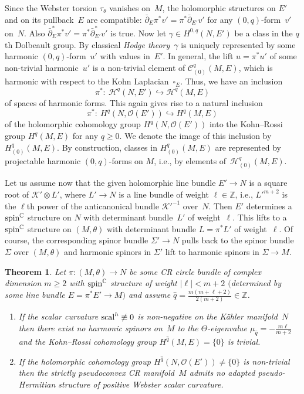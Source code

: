 \documentclass[pdftex]{sigma}
\numberwithin{equation}{section}
\newtheorem{Theorem}{Theorem}[section]
\newcommand{\ZZ}{\mathbb{Z}}
\newcommand{\CC}{\mathbb{C}}
\begin{document}
Since the Webster torsion $\tau_\theta$ vanishes on~$M$, the holomorphic structures on $E'$ and on its pullback~$E$ are compatible:
$\bar{\partial}_E\pi^*v'=\pi^*\bar{\partial}_{E'}v'$ for any $(0,q)$-form~$v'$ on~$N$.
Also $\bar{\partial}^*_E\pi^*v'=\pi^*\bar{\partial}^*_{E'}v'$ is true.
Now let $\gamma\in H^{0,q}(N,E')$ be a class in the $q$th Dolbeault group. By classical {\em Hodge theory}~$\gamma$ is
uniquely represented by some harmonic $(0,q)$-form~$u'$ with values in~$E'$. In general,
the lift $u=\pi^*u'$ of some non-trivial harmonic~$u'$ is a non-trivial element of $\mathcal{C}_{(0)}^q(M,E)$, which is
harmonic with respect to the Kohn Laplacian~$\square_E$. Thus, we have an inclusion
\[
\pi^*\colon \ \mathcal{H}^q(N,E') \hookrightarrow \mathcal{H}^q(M,E)
\]
of spaces of harmonic forms. This again gives rise to a natural inclusion
\[
\pi^*\colon \ H^q(N,\mathcal{O}(E')) \hookrightarrow H^q(M,E)
\]
of the holomorphic cohomology group $H^q(N,\mathcal{O}(E'))$ into the Kohn--Rossi group $H^q(M,E)$ for any $q\geq 0$.
We denote the image of this inclusion by $H_{(0)}^q(M,E)$. By construction, classes in $H_{(0)}^q(M,E)$ are represented
by projectable harmonic $(0,q)$-forms on $M$, i.e., by elements of~$\mathcal{H}_{(0)}^q(M,E)$.

Let us assume now that the given holomorphic line bundle $E'\to N$ is a square root of $\mathcal{K}'\otimes L'$, where $L'\to N$
is a line bundle of weight $\ell\in\ZZ$, i.e., $L'^{m+2}$ is the $\ell$th power of the anticanonical bundle $\mathcal{K}'^{-1}$ over~$N$. Then $E'$ determines a ${\rm spin}^\CC$ structure on $N$ with determinant bundle~$L'$ of weight~$\ell$. This lifts to a ${\rm spin}^\CC$ structure on $(M,\theta)$ with determinant bundle $L=\pi^*L'$ of weight~$\ell$. Of course, the corresponding spinor bundle $\Sigma'\to N$ pulls back to the spinor bundle
$\Sigma$ over $(M,\theta)$ and harmonic spinors in $\Sigma'$ lift to harmonic spinors in $\Sigma\to M$.

\begin{Theorem} \label{RegVan} Let $\pi\colon (M,\theta)\to N$ be some CR circle bundle of complex dimension $m\geq 2$ with ${\rm spin}^\CC$ structure of weight $|\ell|< m+2$
$($determined by some line bundle $E=\pi^*E'\to M)$ and assume $\hat{q}=\frac{m(m+\ell+2)}{2(m+2)}\in\ZZ$.
\begin{enumerate}\itemsep=0pt
\item[$(a)$] If the scalar curvature ${\rm scal}^h\not\equiv 0$ is non-negative on the K\"ahler manifold~$N$ then
there exist no harmonic spinors on~$M$ to the $\Theta$-eigenvalue $\mu_{\hat{q}}=-\frac{m\ell}{m+2}$ and the Kohn--Rossi cohomology group $H^{\hat{q}}(M,E)=\{0\}$
is trivial.
\item[$(b)$] If the holomorphic cohomology group $H^{\hat{q}}(N,\mathcal{O}(E'))\neq\{0\}$ is non-trivial then the strictly pseudoconvex CR manifold~$M$ admits
no adapted pseudo-Hermitian structure of positive Webster scalar curvature.
\end{enumerate}
\end{Theorem}
\end{document}
